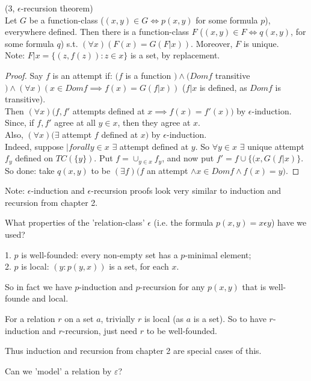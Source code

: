 \documentclass[a4paper]{article}
\begin{document}
\begin{thm} (3, $\epsilon$-recursion theorem)\\
Let $G$ be a function-class ($(x,y) \in G \iff p(x,y)$ for some formula $p$), everywhere defined. Then there is a function-class $F$ ($(x,y) \in F \iff q(x,y)$, for some formula $q$) s.t. $(\forall x) (F(x) = G(F|x))$. Moreover, $F$ is unique.\\
Note: $F|x = \{(z,f(z)): z \in x\}$ is a set, by replacement.
\begin{proof}
Say $f$ is an attempt if: $(f$ is a function $) \wedge (Dom f$ transitive $) \wedge (\forall x) (x \in Dom f \implies f(x) = G(f|x))$ ($f|x$ is defined, as $Dom f$ is transitive).\\
Then $(\forall x) (f,f'$ attempts defined at $x \implies f(x) = f'(x))$ by $\epsilon$-induction.\\
Since, if $f,f'$ agree at all $y \in x$, then they agree at $x$.\\
Also, $(\forall x) (\exists$ attempt $f$ defined at $x)$ by $\epsilon$-induction.\\
Indeed, suppose $|forall y \in x$ $\exists$ attempt defined at $y$. So $\forall y \in x$ $\exists$ unique attempt $f_y$ defined on $TC(\{y\})$. Put $f = \cup_{y \in x} f_y$, and now put $f' = f \cup \{(x,G(f|x)\}$. So done: take $q(x,y)$ to be $(\exists f) (f$ an attempt $\wedge x \in Dom f \wedge f(x) = y)$.
\end{proof}
\end{thm}

Note: $\epsilon$-induction and $\epsilon$-recursion proofs look very similar to induction and recursion from chapter 2.

What properties of the 'relation-class' $\epsilon$ (i.e. the formula $p(x,y) = x\epsilon y$) have we used?

1. $p$ is well-founded: every non-empty set has a $p$-minimal element;\\
2. $p$ is local: $(y:p(y,x))$ is a set, for each $x$.

So in fact we have $p$-induction and $p$-recursion for any $p(x,y)$ that is well-founde and local.

For a relation $r$ on a set $a$, trivially $r$ is local (as $a$ is a set). So to have $r$-induction and $r$-recursion, just need $r$ to be well-founded.

Thus induction and recursion from chapter 2 are special cases of this.

Can we 'model' a relation by $\varepsilon$?
\end{document}
